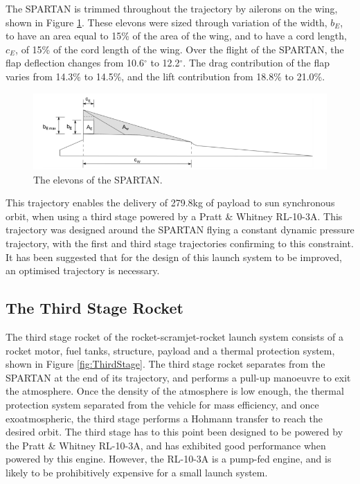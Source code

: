 The SPARTAN is trimmed throughout the trajectory by ailerons on the wing, shown in Figure \ref{fig:SPARTANElevons}. These elevons were sized through variation of the width, $b_E$, to have an area equal to 15\% of the area of the wing, and to have a cord length, $c_E$, of 15\% of the cord length of the wing\cite{Preller2017b}. Over the flight of the SPARTAN, the flap deflection changes from 10.6$^\circ$ to 12.2$^\circ$\cite{Preller2017b}. The drag contribution of the flap varies from 14.3\% to 14.5\%, and the lift contribution from 18.8\% to 21.0\%\cite{Preller2018a}. 

\begin{figure}[ht]
	\centering
	\includegraphics[width=0.7\linewidth]{figures/2_literature-review/SPARTANElevons}
	\caption{The elevons of the SPARTAN\cite{Preller2017b}.}
	\label{fig:SPARTANElevons}
\end{figure}

 This trajectory enables the delivery of 279.8kg of payload to sun synchronous orbit, when using a third stage powered by a Pratt \& Whitney RL-10-3A\cite{Preller2018a}. 
This trajectory was designed around the SPARTAN flying a constant dynamic pressure trajectory, with the first and third stage trajectories confirming to this constraint. It has been suggested that for the design of this launch system to be improved, an optimised trajectory is necessary\cite{Preller2017b}.







\subsection{The Third Stage Rocket}
The third stage rocket of the rocket-scramjet-rocket launch system consists of a rocket motor, fuel tanks, structure, payload and a thermal protection system\cite{Preller2017b}, shown in Figure \ref{fig:ThirdStage}. 
The third stage rocket separates from the SPARTAN at the end of its trajectory, and performs a pull-up manoeuvre to exit the atmosphere. Once the density of the atmosphere is low enough, the thermal protection system separated from the vehicle for mass efficiency, and once exoatmospheric, the third stage performs a Hohmann transfer to reach the desired orbit. 
The third stage has to this point been designed to be powered by the Pratt \& Whitney RL-10-3A\cite{Preller2017b}, and has exhibited good performance when powered by this engine. However, the RL-10-3A is a pump-fed engine, and is likely to be prohibitively expensive for a small launch system. 

